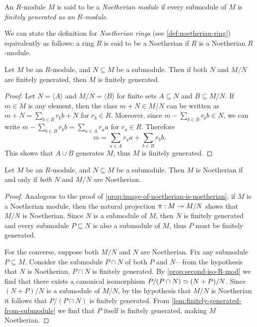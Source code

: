 \begin{definition}
\label{def:noetherian-module}
An \(R\)-module \(M\) is said to be a \emph{Noetherian module} if every
submodule of \(M\) is \emph{finitely generated as an \(R\)-module}.
\end{definition}

We can state the definition for \emph{Noetherian rings} (see
\cref{def:noetherian-ring}) equivalently as follows: a ring \(R\) is said to be
a Noetherian if \(R\) is a Noetherian \(R\)-module.

\begin{lemma}
\label{lem:finitely-generated-from-submodule}
Let \(M\) be an \(R\)-module, and \(N \subseteq M\) be a submodule. Then if both
\(N\) and \(M/N\) are finitely generated, then \(M\) is finitely generated.
\end{lemma}

\begin{proof}
Let \(N = \langle A \rangle\) and \(M/N = \langle B \rangle\) for finite sets
\(A \subseteq N\) and \(B \subseteq M/N\). If \(m \in M\) is any element, then
the class \(m + N \in M/N\) can be written as
\(m + N = \sum_{b \in B} r_b b + N\) for \(r_b \in R\). Moreover, since
\(m - \sum_{b \in B} r_b b \in N\), we can write
\(m - \sum_{b \in B} r_b b = \sum_{a \in A} r_a a\) for \(r_a \in R\). Therefore
\[
m = \sum_{a \in A} r_a a + \sum_{b \in B} r_b b.
\]
This shows that \(A \cup B\) generates \(M\), thus \(M\) is finitely generated.
\end{proof}

\begin{proposition}
\label{prop:noetherian-from-submodule}
Let \(M\) be an \(R\)-module, and \(N \subseteq M\) be a submodule. Then \(M\)
is Noetherian if and only if \emph{both} \(N\) and \(M/N\) are Noetherian.
\end{proposition}

\begin{proof}
Analogous to the proof of \cref{prop:image-of-noetherian-is-noetherian}, if
\(M\) is a Noetherian module, then the natural projection \(\pi: M \twoheadrightarrow M/N\)
shows that \(M/N\) is Noetherian. Since \(N\) is a submodule of \(M\), then
\(N\) is finitely generated and every submodule \(P \subseteq N\) is also a
submodule of \(M\), thus \(P\) must be finitely generated.

For the converse, suppose both \(M/N\) and \(N\) are Noetherian. Fix any
submodule \(P \subseteq M\). Consider the submodule \(P \cap N\) of both \(P\)
and \(N\)---from the hypothesis that \(N\) is Noetherian, \(P \cap N\) is
finitely generated. By \cref{prop:second-iso-R-mod} we find that there exists a
canonical isomorphism \(P/(P \cap N) \simeq (N + P)/N\). Since
\((N + P)/N\) is a submodule of \(M/N\), by the hypothesis that \(M/N\) is
Noetherian it follows that \(P/(P \cap N)\) is finitely generated. From
\cref{lem:finitely-generated-from-submodule} we find that \(P\) itself is
finitely generated, making \(M\) Noetherian.
\end{proof}

